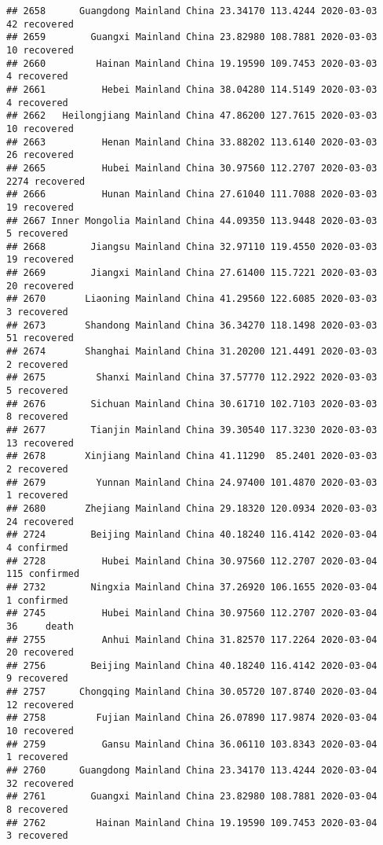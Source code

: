 \documentclass[
]{article}
\begin{document}
\begin{verbatim}
## 2658      Guangdong Mainland China 23.34170 113.4244 2020-03-03    42 recovered
## 2659        Guangxi Mainland China 23.82980 108.7881 2020-03-03    10 recovered
## 2660         Hainan Mainland China 19.19590 109.7453 2020-03-03     4 recovered
## 2661          Hebei Mainland China 38.04280 114.5149 2020-03-03     4 recovered
## 2662   Heilongjiang Mainland China 47.86200 127.7615 2020-03-03    10 recovered
## 2663          Henan Mainland China 33.88202 113.6140 2020-03-03    26 recovered
## 2665          Hubei Mainland China 30.97560 112.2707 2020-03-03  2274 recovered
## 2666          Hunan Mainland China 27.61040 111.7088 2020-03-03    19 recovered
## 2667 Inner Mongolia Mainland China 44.09350 113.9448 2020-03-03     5 recovered
## 2668        Jiangsu Mainland China 32.97110 119.4550 2020-03-03    19 recovered
## 2669        Jiangxi Mainland China 27.61400 115.7221 2020-03-03    20 recovered
## 2670       Liaoning Mainland China 41.29560 122.6085 2020-03-03     3 recovered
## 2673       Shandong Mainland China 36.34270 118.1498 2020-03-03    51 recovered
## 2674       Shanghai Mainland China 31.20200 121.4491 2020-03-03     2 recovered
## 2675         Shanxi Mainland China 37.57770 112.2922 2020-03-03     5 recovered
## 2676        Sichuan Mainland China 30.61710 102.7103 2020-03-03     8 recovered
## 2677        Tianjin Mainland China 39.30540 117.3230 2020-03-03    13 recovered
## 2678       Xinjiang Mainland China 41.11290  85.2401 2020-03-03     2 recovered
## 2679         Yunnan Mainland China 24.97400 101.4870 2020-03-03     1 recovered
## 2680       Zhejiang Mainland China 29.18320 120.0934 2020-03-03    24 recovered
## 2724        Beijing Mainland China 40.18240 116.4142 2020-03-04     4 confirmed
## 2728          Hubei Mainland China 30.97560 112.2707 2020-03-04   115 confirmed
## 2732        Ningxia Mainland China 37.26920 106.1655 2020-03-04     1 confirmed
## 2745          Hubei Mainland China 30.97560 112.2707 2020-03-04    36     death
## 2755          Anhui Mainland China 31.82570 117.2264 2020-03-04    20 recovered
## 2756        Beijing Mainland China 40.18240 116.4142 2020-03-04     9 recovered
## 2757      Chongqing Mainland China 30.05720 107.8740 2020-03-04    12 recovered
## 2758         Fujian Mainland China 26.07890 117.9874 2020-03-04    10 recovered
## 2759          Gansu Mainland China 36.06110 103.8343 2020-03-04     1 recovered
## 2760      Guangdong Mainland China 23.34170 113.4244 2020-03-04    32 recovered
## 2761        Guangxi Mainland China 23.82980 108.7881 2020-03-04     8 recovered
## 2762         Hainan Mainland China 19.19590 109.7453 2020-03-04     3 recovered

\end{verbatim}
\end{document}
